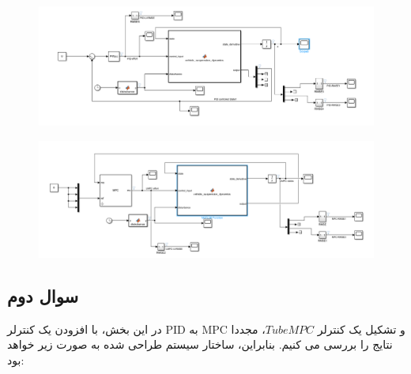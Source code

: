 \begin{figure}[H]
	\centering
	\includegraphics[width=1\linewidth]{../img/17}
	\caption{}
	\label{fig:17}
\end{figure}

\begin{figure}[H]
	\centering
	\includegraphics[width=1\linewidth]{../img/18}
	\caption{}
	\label{fig:18}
\end{figure}

\subsection*{سوال دوم}
در این بخش، با افزودن یک کنترلر PID به MPC و تشکیل یک کنترلر $Tube MPC$، مجددا نتایج را بررسی می کنیم. بنابراین، ساختار سیستم طراحی شده به صورت زیر خواهد بود:

